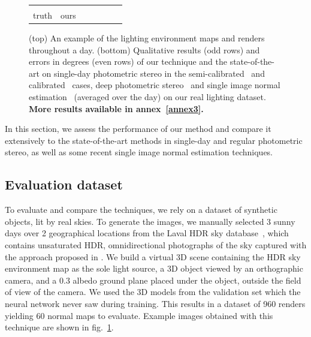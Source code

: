 \begin{figure}
\begin{tabular*}{\linewidth}{@{}c@{}c@{}c@{}c@{}c@{}c@{}c@{}}
\begin{tabular}{@{}c@{}}ground\\truth\end{tabular} & ours & \cite{jung-cvpr-15} & \cite{yu-iccp-13} & \cite{santo-iccv-17} & \cite{wu-nips-17} & \cite{eigen-iccv-15} \\
\end{tabular*}
\egroup
\caption[Lighting environment maps and renders throughout a day]{(top) An example of the lighting environment maps and renders throughout a day. (bottom) Qualitative results (odd rows) and errors in degrees (even rows) of our technique and the state-of-the-art on single-day photometric stereo in the semi-calibrated~\cite{jung-cvpr-15} and calibrated~\cite{yu-iccp-13} cases, deep photometric stereo~\cite{santo-iccv-17} and single image normal estimation~\cite{wu-nips-17,eigen-iccv-15} (averaged over the day) on our real lighting dataset. \textbf{More results available in annex~\ref{annex3}.}}
\label{fig:results-qualitative}
\end{figure}


In this section, we assess the performance of our method and compare it extensively to the state-of-the-art methods in single-day and regular photometric stereo, as well as some recent single image normal estimation techniques.

\subsection{Evaluation dataset}
\label{sec:evaluation_dataset}

To evaluate and compare the techniques, we rely on a dataset of synthetic objects, lit by real skies. To generate the images, we manually selected 3 sunny days over 2 geographical locations from the Laval HDR sky database~\cite{hdrdb}, which contains unsaturated HDR, omnidirectional photographs of the sky captured with the approach proposed in \cite{stumpfel-afrigraph-04}. We build a virtual 3D scene containing the HDR sky environment map as the sole light source, a 3D object viewed by an orthographic camera, and a 0.3 albedo ground plane placed under the object, outside the field of view of the camera. We used the 3D models from the validation set which the neural network never saw during training. This results in a dataset of 960 renders yielding 60 normal maps to evaluate. Example images obtained with this technique are shown in fig.~\ref{fig:results-qualitative}. 


